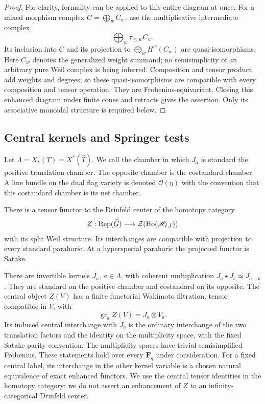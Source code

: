 \begin{proof}
For clarity, formality can be applied to this entire diagram at once.
For a mixed morphism complex $C=\bigoplus_w C_w$, use the
multiplicative intermediate complex
\[
 \bigoplus_w\tau_{\leq w}C_w.
\]
Its inclusion into $C$ and its projection to
$\bigoplus_w H^w(C_w)$ are quasi-isomorphisms. Here $C_w$ denotes
the generalized weight summand; no semisimplicity of an arbitrary
pure Weil complex is being inferred. Composition and tensor product
add weights and degrees, so these quasi-isomorphisms are compatible
with every composition and tensor operation. They are
Frobenius-equivariant. Closing this enhanced diagram under finite
cones and retracts gives the assertion. Only its associative
monoidal structure is required below.
\end{proof}

\subsection{Central kernels and Springer tests}

Let $\Lambda=X_*(T)=X^*(\widehat T)$. We call the chamber in which
$J_a$ is standard the positive translation chamber. The opposite
chamber is the costandard chamber. A line bundle on the dual flag
variety is denoted $\mathcal O(\eta)$ with the convention that this
costandard chamber is its nef chamber.

\begin{theorem}\label{cat:central}
There is a tensor functor to the Drinfeld center of the homotopy
category
\[
 Z:\operatorname{Rep}(\widehat G)\longrightarrow
       \mathcal Z(\operatorname{Ho}(\mathscr H_{I,I}))
\]
with its split Weil structure. Its interchanges are compatible with
projection to every standard parahoric. At a hyperspecial parahoric
the projected functor is Satake.

There are invertible kernels $J_a$, $a\in\Lambda$, with coherent
multiplication $J_a\star J_b\simeq J_{a+b}$. They are standard on
the positive chamber and costandard on its opposite. The central
object $Z(V)$ has a finite functorial Wakimoto filtration, tensor
compatible in $V$, with
\[
 \operatorname{gr}_a Z(V)=J_a\otimes V_a.
\]
Its induced central interchange with $J_b$ is the ordinary interchange
of the two translation factors and the identity on the multiplicity
space, with the fixed Satake parity convention. The multiplicity
spaces have trivial semisimplified Frobenius. These statements hold
over every $\mathbf F_q$ under consideration.
For a fixed central label, its interchange in the other kernel
variable is a chosen natural equivalence of exact enhanced functors.
We use the central tensor identities in the homotopy category;
we do not assert an enhancement of $Z$ to an infinity-categorical
Drinfeld center.
\end{theorem}


